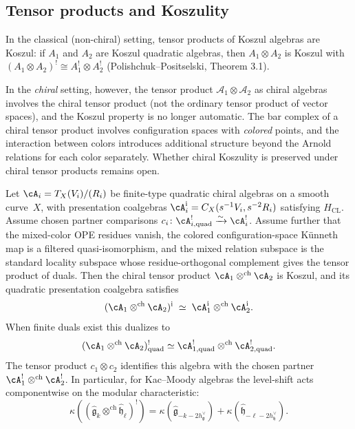 \subsection{Tensor products and Koszulity}

\begin{remark}
In the classical (non-chiral) setting, tensor products of Koszul algebras are Koszul: if $A_1$ and $A_2$ are Koszul quadratic algebras, then $A_1 \otimes A_2$ is Koszul with $(A_1 \otimes A_2)^! \cong A_1^! \otimes A_2^!$ (Polishchuk--Positselski, Theorem 3.1).

In the \emph{chiral} setting, however, the tensor product $\mathcal{A}_1 \otimes \mathcal{A}_2$ as chiral algebras involves the chiral tensor product (not the ordinary tensor product of vector spaces), and the Koszul property is no longer automatic. The bar complex of a chiral tensor product involves configuration spaces with \emph{colored} points, and the interaction between colors introduces additional structure beyond the Arnold relations for each color separately. Whether chiral Koszulity is preserved under chiral tensor products remains open.
\end{remark}

\begin{proposition}
\label{prop:koszul-dual-tensor-product}
Let $\cA_i=T_X(V_i)/(R_i)$ be finite-type quadratic chiral algebras on
a smooth curve~$X$, with presentation coalgebras
$\cA_i^{\mathrm i}=C_X(s^{-1}V_i,s^{-2}R_i)$ satisfying
$H_{\mathrm{CL}}$.  Assume chosen partner comparisons
$c_i\colon\cA^!_{i,\mathrm{quad}}\xrightarrow{\sim}\cA_i^!$.
Assume further that the
mixed-color OPE residues vanish, the colored configuration-space
K\"unneth map is a filtered quasi-isomorphism, and the mixed relation
subspace is the standard locality subspace whose residue-orthogonal
complement gives the tensor product of duals. Then the chiral tensor
product $\cA_1\otimes^{\mathrm{ch}}\cA_2$ is Koszul, and its
quadratic presentation coalgebra satisfies
\begin{equation}\label{eq:koszul-dual-tensor}
(\cA_1 \otimes^{\mathrm{ch}} \cA_2)^{\mathrm i}
\;\simeq\;
\cA_1^{\mathrm i}\otimes^{\mathrm{ch}}\cA_2^{\mathrm i}.
\end{equation}
When finite duals exist this dualizes to
\[
(\cA_1 \otimes^{\mathrm{ch}} \cA_2)^!_{\mathrm{quad}}
\simeq
\cA^!_{1,\mathrm{quad}}\otimes^{\mathrm{ch}}
\cA^!_{2,\mathrm{quad}}.
\]
The tensor product $c_1\otimes c_2$ identifies this algebra with the
chosen partner $\cA_1^!\otimes^{\mathrm{ch}}\cA_2^!$. In particular, for
Kac--Moody algebras the level-shift acts componentwise on the modular
characteristic:
\[
\kappa\!\left((\widehat{\mathfrak{g}}_k
\otimes^{\mathrm{ch}}\widehat{\mathfrak{h}}_\ell)^!\right)
=
\kappa(\widehat{\mathfrak{g}}_{-k-2h^\vee_{\mathfrak{g}}})
+
\kappa(\widehat{\mathfrak{h}}_{-\ell-2h^\vee_{\mathfrak{h}}}).
\]
\end{proposition}

